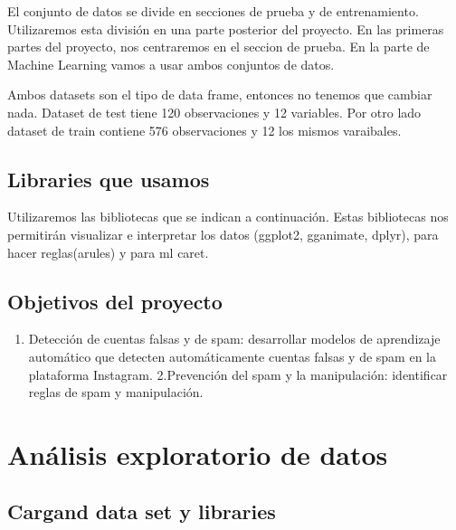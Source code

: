 \documentclass[
  letterpaper,
  DIV=11,
  numbers=noendperiod]{scrreprt}
\providecommand{\tightlist}{%
  \setlength{\itemsep}{0pt}\setlength{\parskip}{0pt}}\usepackage{longtable,booktabs,array}
\begin{document}
El conjunto de datos se divide en secciones de prueba y de
entrenamiento. Utilizaremos esta división en una parte posterior del
proyecto. En las primeras partes del proyecto, nos centraremos en el
seccion de prueba. En la parte de Machine Learning vamos a usar ambos
conjuntos de datos.

Ambos datasets son el tipo de data frame, entonces no tenemos que
cambiar nada. Dataset de test tiene 120 observaciones y 12 variables.
Por otro lado dataset de train contiene 576 observaciones y 12 los
mismos varaibales.

\hypertarget{libraries-que-usamos}{%
\section{Libraries que usamos}\label{libraries-que-usamos}}

Utilizaremos las bibliotecas que se indican a continuación. Estas
bibliotecas nos permitirán visualizar e interpretar los datos (ggplot2,
gganimate, dplyr), para hacer reglas(arules) y para ml caret.

\hypertarget{objetivos-del-proyecto}{%
\section{Objetivos del proyecto}\label{objetivos-del-proyecto}}

\begin{enumerate}
\def\labelenumi{\arabic{enumi}.}
\tightlist
\item
  Detección de cuentas falsas y de spam: desarrollar modelos de
  aprendizaje automático que detecten automáticamente cuentas falsas y
  de spam en la plataforma Instagram. 2.Prevención del spam y la
  manipulación: identificar reglas de spam y manipulación.
\end{enumerate}


\hypertarget{anuxe1lisis-exploratorio-de-datos}{%
\chapter{Análisis exploratorio de
datos}\label{anuxe1lisis-exploratorio-de-datos}}

\hypertarget{cargand-data-set-y-libraries}{%
\section{Cargand data set y
libraries}\label{cargand-data-set-y-libraries}}
\end{document}
